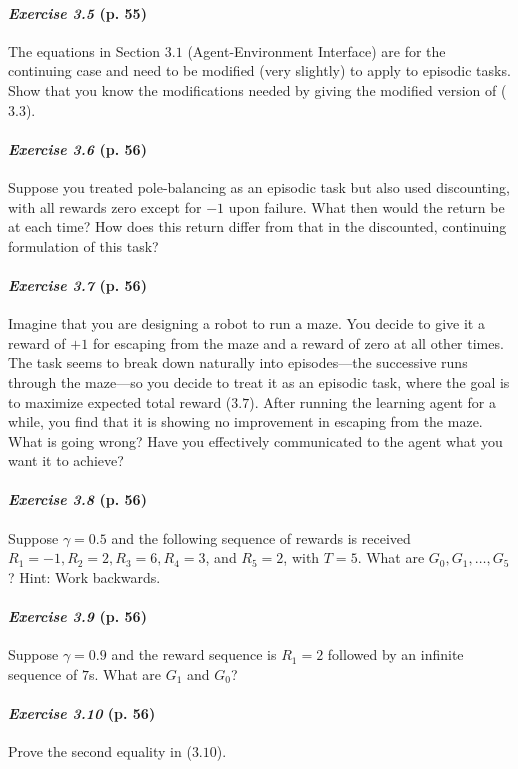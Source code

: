\documentclass[10pt,a4paper]{article}
\begin{document}
\paragraph{\textit{Exercise 3.5} (p. 55)} The equations in Section $3.1$ (Agent-Environment Interface) are for the continuing case and need to be modified (very slightly) to apply to episodic tasks. Show that you know the modifications needed by giving the modified version of ($3.3$).

\paragraph{\textit{Exercise 3.6} (p. 56)} Suppose you treated pole-balancing as an episodic task but also used discounting, with all rewards zero except for $-1$ upon failure. What then would the return be at each time? How does this return differ from that in the discounted, continuing formulation of this task?

\paragraph{\textit{Exercise 3.7} (p. 56)} Imagine that you are designing a robot to run a maze. You decide to give it a reward of $+1$ for escaping from the maze and a reward of zero at all other times. The task seems to break down naturally into episodes---the successive runs through the maze---so
you decide to treat it as an episodic task, where the goal is to maximize expected total reward ($3.7$). After running the learning agent for a while, you find that it is showing no improvement in escaping from the maze. What is going wrong? Have you effectively communicated to the agent what you want it to achieve?

\paragraph{\textit{Exercise 3.8} (p. 56)} Suppose $\gamma = 0.5$ and the following sequence of rewards is received $R_1 = -1,
R_2 = 2, R_3 = 6, R_4 = 3$, and $R_5 = 2$, with $T = 5$. What are $G_0, G_1, \hdots, G_5$? Hint:
Work backwards.

\paragraph{\textit{Exercise 3.9} (p. 56)} Suppose $\gamma = 0.9$ and the reward sequence is $R_1 = 2$ followed by an infinite sequence of $7$s. What are $G_1$ and $G_0$?
\paragraph{\textit{Exercise 3.10} (p. 56)} Prove the second equality in ($3.10$).
\end{document}

